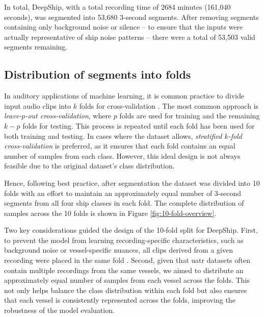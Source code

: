 In total, DeepShip, with a total recording time of 2684 minutes (161,040 seconds), was segmented into 53,680 3-second segments. After removing segments containing only background noise or silence -- to ensure that the inputs were actually representative of ship noise patterns -- there were a total of 53,503 valid segments remaining.

\subsection{Distribution of segments into folds}

In auditory applications of machine learning, it is common practice to divide input audio clips into $k$ folds for cross-validation \cite{chi_classifying_2022, basili_classification_2004, zeng_spectrogram_2019, chen_ship-radiated_2024, chen_hierarchical_2024}. The most common approach is \textit{leave-$p$-out cross-validation}, where $p$ folds are used for training and the remaining $k-p$ folds for testing. This process is repeated until each fold has been used for both training and testing. In cases where the dataset allows, \textit{stratified $k$-fold cross-validation} is preferred, as it ensures that each fold contains an equal number of samples from each class. However, this ideal design is not always feasible due to the original dataset's class distribution.

Hence, following best practice, after segmentation the dataset was divided into 10 folds with an effort to maintain an approximately equal number of 3-second segments from all four ship classes in each fold. The complete distribution of samples across the 10 folds is shown in Figure \ref{fig:10-fold-overview}.

Two key considerations guided the design of the 10-fold split for DeepShip. First, to prevent the model from learning recording-specific characteristics, such as background noise or vessel-specific nuances, all clips derived from a given recording were placed in the same fold \cite{chi_classifying_2022}. Second, given that \acrshort{uatr} datasets often contain multiple recordings from the same vessels, we aimed to distribute an approximately equal number of samples from each vessel across the folds. This not only helps balance the class distribution within each fold but also ensures that each vessel is consistently represented across the folds, improving the robustness of the model evaluation.

